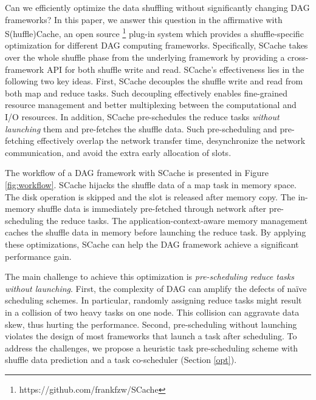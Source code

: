 Can we efficiently optimize the data shuffling without significantly changing DAG frameworks?
In this paper, we answer this question in the affirmative with S(huffle)Cache, an open source \footnote{https://github.com/frankfzw/SCache} plug-in system which provides a shuffle-specific optimization for different DAG computing frameworks.
Specifically, SCache takes over the whole shuffle phase from the underlying framework by providing a cross-framework API for both shuffle write and read.
SCache's effectiveness lies in the following two key ideas.
First, SCache decouples the shuffle write and read from both map and reduce tasks.
\ifrevision
{}
\fi
Such decoupling effectively enables fine-grained resource management and better multiplexing between the computational and I/O resources.
In addition, SCache pre-schedules the reduce tasks \emph{without launching} them and pre-fetches the shuffle data. 
Such pre-scheduling and pre-fetching effectively overlap the network transfer time, desynchronize the network communication, 
and avoid the extra early allocation of slots.

The workflow of a DAG framework with SCache is presented in Figure \ref{fig:workflow}. 
SCache hijacks the shuffle data of a map task in memory space. 
The disk operation is skipped and the slot is released after memory copy. 
The in-memory shuffle data is immediately pre-fetched through network after pre-scheduling the reduce tasks. 
The application-context-aware memory management caches the shuffle data in memory before launching the reduce task.
By applying these optimizations, SCache can help the DAG framework achieve a significant performance gain. 

The main challenge to achieve this optimization is \textit{pre-scheduling reduce tasks without launching}. 
First, the complexity of DAG can amplify the defects of na\"{i}ve scheduling schemes. 
In particular, randomly assigning reduce tasks might result in a collision of two heavy tasks on one node. 
This collision can aggravate data skew, thus hurting the performance. 
Second, pre-scheduling without launching violates the design of most frameworks that launch a task after scheduling.
To address the challenges, we propose a heuristic task pre-scheduling scheme with shuffle data prediction and a task co-scheduler (Section \ref{opt}).

